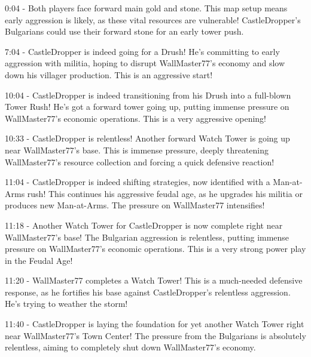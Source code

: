 0:04 - Both players face forward main gold and stone. This map setup means early aggression is likely, as these vital resources are vulnerable! CastleDropper's Bulgarians could use their forward stone for an early tower push. \par \vspace{1em}

7:04 - CastleDropper is indeed going for a Drush! He's committing to early aggression with militia, hoping to disrupt WallMaster77's economy and slow down his villager production. This is an aggressive start! \par \vspace{1em}

10:04 - CastleDropper is indeed transitioning from his Drush into a full-blown Tower Rush! He's got a forward tower going up, putting immense pressure on WallMaster77's economic operations. This is a very aggressive opening! \par \vspace{1em}

10:33 - CastleDropper is relentless! Another forward Watch Tower is going up near WallMaster77's base. This is immense pressure, deeply threatening WallMaster77's resource collection and forcing a quick defensive reaction! \par \vspace{1em}

11:04 - CastleDropper is indeed shifting strategies, now identified with a Man-at-Arms rush! This continues his aggressive feudal age, as he upgrades his militia or produces new Man-at-Arms. The pressure on WallMaster77 intensifies! \par \vspace{1em}

11:18 - Another Watch Tower for CastleDropper is now complete right near WallMaster77's base! The Bulgarian aggression is relentless, putting immense pressure on WallMaster77's economic operations. This is a very strong power play in the Feudal Age! \par \vspace{1em}

11:20 - WallMaster77 completes a Watch Tower! This is a much-needed defensive response, as he fortifies his base against CastleDropper's relentless aggression. He's trying to weather the storm! \par \vspace{1em}

11:40 - CastleDropper is laying the foundation for yet another Watch Tower right near WallMaster77's Town Center! The pressure from the Bulgarians is absolutely relentless, aiming to completely shut down WallMaster77's economy. \par \vspace{1em}


